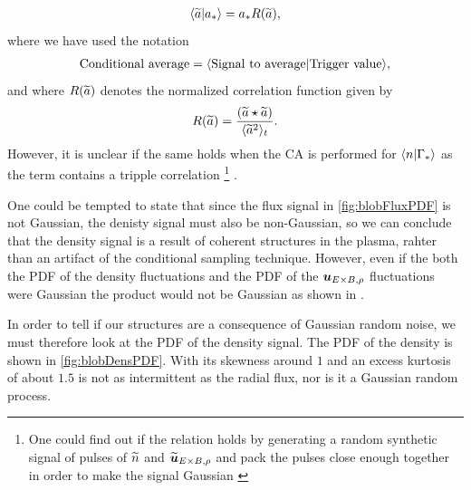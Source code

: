 %
\begin{align*}
    \langle{\widetilde{ a}}|{a_*}\rangle = a_*R(\widetilde{ a}),
\end{align*}
%
where we have used the notation
%
\begin{align*}
    \text{Conditional average} = \langle{\text{Signal to average}}|{\text{Trigger value}}\rangle,
\end{align*}
%
and where $R(\widetilde{ a})$ denotes the normalized correlation function given by
%
\begin{align*}
    R(\widetilde{ a}) = \frac{(\widetilde{ a}\star\widetilde{ a})}{\langle{\widetilde{ a}^2}\rangle_t}.
\end{align*}
%
However, it is unclear if the same holds when the CA is performed for $\langle{n}|{\Gamma_*}\rangle$ as the term contains a tripple correlation%
\footnote{One could find out if the relation holds by generating a random synthetic signal of pulses of $\widetilde{ n}$ and $\widetilde{ \boldsymbol{u}}_{E\times B, \rho}$ and pack the pulses close enough together in order to make the signal Gaussian \cite{Pecseli2017Private}}%
.

One could be tempted to state that since the flux signal in \cref{fig:blobFluxPDF} is not Gaussian, the denisty signal must also be non-Gaussian, so we can conclude that the density signal is a result of coherent structures in the plasma, rahter than an artifact of the conditional sampling technique.
However, even if the both the PDF of the density fluctuations and the PDF of the $\boldsymbol{u}_{E\times B,\rho}$ fluctuations were Gaussian the product would not be Gaussian as shown in \cite{Bergsaker2015}.

In order to tell if our structures are a consequence of Gaussian random noise, we must therefore look at the PDF of the density signal.
The PDF of the density is shown in \cref{fig:blobDensPDF}.
With its skewness around $1$ and an excess kurtosis of about $1.5$ is not as intermittent as the radial flux, nor is it a Gaussian random process.
%

